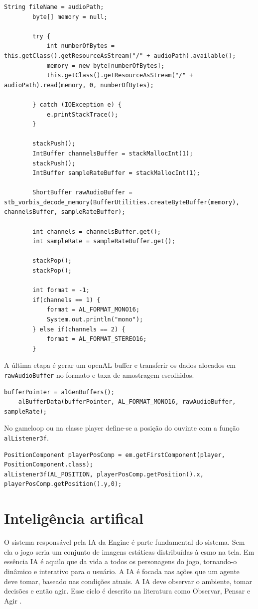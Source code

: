 \documentclass[12pt, 
openright, 
oneside, 
a4paper,    
brazil]{facom-ufu-abntex2}
\begin{document}
\begin{lstlisting}[caption=Leitura do arquivo de aúdio]
        String fileName = audioPath;
        byte[] memory = null;
         
        try {
            int numberOfBytes = this.getClass().getResourceAsStream("/" + audioPath).available();
            memory = new byte[numberOfBytes];
            this.getClass().getResourceAsStream("/" + audioPath).read(memory, 0, numberOfBytes);
             
        } catch (IOException e) {
            e.printStackTrace();
        }
 
        stackPush();
        IntBuffer channelsBuffer = stackMallocInt(1);
        stackPush();
        IntBuffer sampleRateBuffer = stackMallocInt(1);

        ShortBuffer rawAudioBuffer = stb_vorbis_decode_memory(BufferUtilities.createByteBuffer(memory), channelsBuffer, sampleRateBuffer);
 
        int channels = channelsBuffer.get();
        int sampleRate = sampleRateBuffer.get();

        stackPop();
        stackPop();
 
        int format = -1;
        if(channels == 1) {
            format = AL_FORMAT_MONO16;
            System.out.println("mono");
        } else if(channels == 2) {
            format = AL_FORMAT_STEREO16;
        }
\end{lstlisting}

A última etapa é gerar um openAL buffer e transferir os dados alocados em \texttt{rawAudioBuffer} no formato e taxa de amostragem escolhidos.
\begin{lstlisting}[caption=OpenAL Buffers]
    bufferPointer = alGenBuffers();
    alBufferData(bufferPointer, AL_FORMAT_MONO16, rawAudioBuffer, sampleRate);
\end{lstlisting}

No gameloop ou na classe player define-se a posição do ouvinte com a função \texttt{alListener3f}.

\begin{lstlisting}[caption=OpenAL Listener]
PositionComponent playerPosComp = em.getFirstComponent(player, PositionComponent.class);
alListener3f(AL_POSITION, playerPosComp.getPosition().x, playerPosComp.getPosition().y,0);
\end{lstlisting}

\chapter{Inteligência artifical}
O sistema responsável pela IA da Engine é parte fundamental do sistema. Sem ela o jogo seria um conjunto de imagens estáticas distribuídas à esmo na tela.
Em essência IA é aquilo que da vida a todos os personagens do jogo, tornando-o dinâmico e interativo para o usuário.
A IA é focada nas ações que um agente deve tomar, baseado nas condições atuais. A IA deve observar o ambiente, tomar decisões e então agir. Esse ciclo é descrito na literatura como Observar, Pensar e Agir \cite{GameDevAI}.
\end{document}
